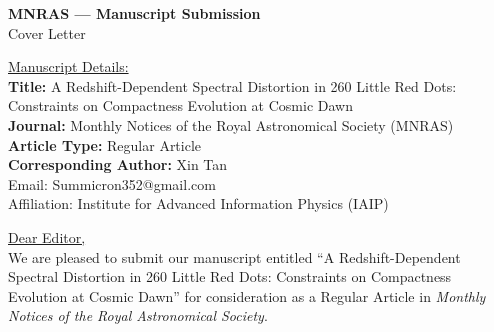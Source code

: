 \documentclass[11pt,a4paper]{article}
\begin{document}
\thispagestyle{empty}

\begin{center}
{\Large \bf MNRAS --- Manuscript Submission}\\[8pt]
{\large Cover Letter}\\
\end{center}

\vspace{12pt}

\noindent\underline{Manuscript Details:}\\[4pt]
{\small
\textbf{Title:} A Redshift-Dependent Spectral Distortion in 260 Little Red Dots: Constraints on Compactness Evolution at Cosmic Dawn\\[3pt]
\textbf{Journal:} Monthly Notices of the Royal Astronomical Society (MNRAS)\\[3pt]
\textbf{Article Type:} Regular Article\\[3pt]
\textbf{Corresponding Author:} Xin Tan\\
Email: Summicron352@gmail.com\\
Affiliation: Institute for Advanced Information Physics (IAIP)
}

\vspace{16pt}

\noindent\underline{Dear Editor,}\\[6pt]

We are pleased to submit our manuscript entitled
``A Redshift-Dependent Spectral Distortion in 260 Little Red Dots:
Constraints on Compactness Evolution at Cosmic Dawn''
for consideration as a Regular Article in {\it Monthly Notices of the
Royal Astronomical Society}.
\end{document}
